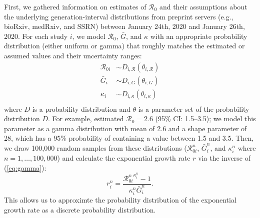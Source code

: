 \documentclass[12pt]{article}
\newcommand{\eref}[1]{(\ref{eq:#1})}
\begin{document}
First, we gathered information on estimates of $\mathcal R_0$ and their
assumptions about the underlying generation-interval distributions from preprint servers (e.g., bioRxiv, medRxiv, and SSRN) between January 24th, 2020 and January 26th, 2020.
For each study $i$, we model $\mathcal R_0$, $\bar G$, and $\kappa$ with an appropriate probability distribution (either uniform or gamma) that roughly matches the estimated or assumed values and their uncertainty ranges:
\begin{equation}
\begin{aligned}
\mathcal R_{0i} &\sim D_{i, \mathcal R}(\theta_{i, \mathcal R})\\
{\bar G}_i &\sim D_{i, G}(\theta_{i, G})\\
\kappa_i &\sim D_{i, \kappa}(\theta_{i, \kappa})\\
\end{aligned}
\end{equation}
where $D$ is a probability distribution and $\theta$ is a parameter set of the probability distribution $D$.
For example, \cite{imaincov} estimated $\mathcal R_0 = 2.6$ (95\% CI: 1.5--3.5);
we model this parameter as a gamma distribution with mean of 2.6 and a shape parameter of 28, which has a 95\% probability of containing a value between 1.5 and 3.5.
Then, we draw 100,000 random samples from these distributions ($\mathcal R_{0i}^n$, ${\bar G}_i^n$, and $\kappa_i^n$ where $n = 1, \dots, 100,000$) and calculate the exponential growth rate $r$ via the inverse of \eref{gamma}:
\begin{equation}
r_i^n = \frac{{\mathcal R_{0i}^n}^{\kappa_i^n} - 1}{\kappa_i^n \bar{G}_i^n}.
\end{equation}
This allows us to approximte the probability distribution of the exponential growth rate as a discrete probability distribution.
\end{document}
